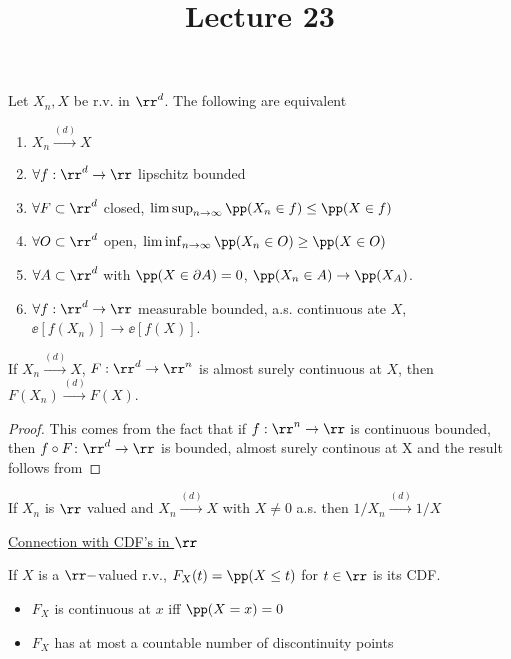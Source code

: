 \documentclass[../main.tex]{subfiles}
\title{Lecture 23}
\begin{document}
\begin{theorem*}
  Let $X_n, X$ be r.v. in $\rr^d$. The following are equivalent
  \begin{enumerate}
    \item $X_n \overset{(d)}{\longrightarrow} X$
    \item $\forall f : \rr^d \to \rr$ lipschitz bounded
    \item $\forall F \subset \rr^d$ closed, $\limsup_{n \to \infty} \pp(X_n \in
      f) \leq \pp(X \in f)$
    \item $\forall O \subset \rr^d$ open, $\liminf_{n \to \infty} \pp(X_n \in
      O) \geq \pp(X \in O)$
    \item $\forall A \subset \rr^d$ with $\pp(X \in \partial A) = 0$, $\pp(X_n
      \in A) \to \pp(X_A)$.
    \item   $\forall f: \rr^d \to \rr$ measurable bounded, a.s. continuous ate
      $X$, $\ee[f(X_n)] \to \ee[f(X)]$.
  \end{enumerate}
\end{theorem*}
\begin{corollary}
  If $X_n \overset{(d)}{\longrightarrow} X$, $F : \rr^d \to \rr^n$ is almost
  surely continuous at $X$, then $F(X_n) \overset{(d)}{\longrightarrow} F(X)$.
\end{corollary}
\begin{proof}
    This comes from the fact that if $f : \rr^n \to \rr$ is continuous bounded,
    then $f \circ F \colon \rr^d \to \rr$ is bounded, almost surely continous at
    X and the result follows from 
\end{proof}

\begin{example}
  If $X_n$ is $\rr$ valued and $X_n \overset{(d)}{\longrightarrow} X$ with $X
  \neq 0$ a.s. then $1/X_n \overset{(d)}{\longrightarrow} 1/X$
\end{example}

\vspace{0.4em}
\noindent
\underline{\sffamily Connection with CDF's in $\rr$}

\vspace{0.4em}
\noindent
If $X$ is a $\rr-$valued r.v., $F_X(t) = \pp(X \leq t)$ for $t \in \rr$ is its
CDF.

\begin{itemize}
  \item $F_X$ is continuous at $x$ iff $\pp(X=x) = 0$
  \item $F_X$ has at most a countable number of discontinuity points
\end{itemize}
\end{document}
